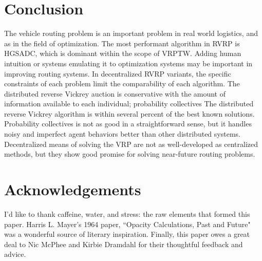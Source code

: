 \documentclass{sig-alternate}
\begin{document}
\section{Conclusion}
\label{conclusion}
The vehicle routing problem is an important problem in real world logistics, and as in the field of optimization. The most performant algorithm in RVRP is HGSADC, which is dominant within the scope of VRPTW. Adding human intuition or systems emulating it to optimization systems may be important in improving routing systems. In decentralized RVRP variants, the specific constraints of each problem limit the comparability of each algorithm. The distributed reverse Vickrey auction is conservative with the amount of information available to each individual; probability collectives The distributed reverse Vickrey algorithm is within several percent of the best known solutions. Probability collectives is not as good in a straightforward sense, but it handles noisy and imperfect agent behaviors better than other distributed systems. Decentralized means of solving the VRP are not as well-developed as centralized methods, but they show good promise for solving near-future routing problems.

\section*{Acknowledgements}
I'd like to thank caffeine, water, and stress: the raw elements that formed this paper. Harris L. Mayer's 1964 paper, ``Opacity Calculations, Past and Future" was a wonderful source of literary inspiration. Finally, this paper owes a great deal to Nic McPhee and Kirbie Dramdahl for their thoughtful feedback and advice.


\end{document}
